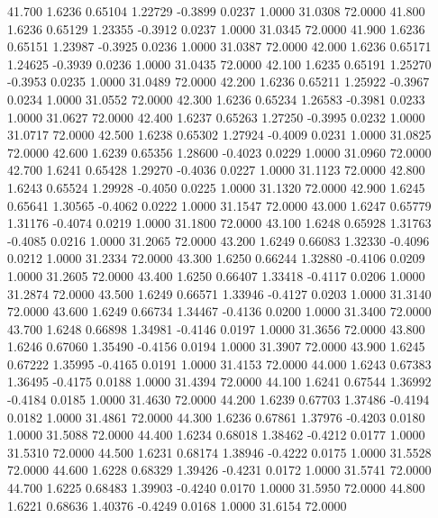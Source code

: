   41.700   1.6236   0.65104   1.22729  -0.3899   0.0237   1.0000  31.0308  72.0000
  41.800   1.6236   0.65129   1.23355  -0.3912   0.0237   1.0000  31.0345  72.0000
  41.900   1.6236   0.65151   1.23987  -0.3925   0.0236   1.0000  31.0387  72.0000
  42.000   1.6236   0.65171   1.24625  -0.3939   0.0236   1.0000  31.0435  72.0000
  42.100   1.6235   0.65191   1.25270  -0.3953   0.0235   1.0000  31.0489  72.0000
  42.200   1.6236   0.65211   1.25922  -0.3967   0.0234   1.0000  31.0552  72.0000
  42.300   1.6236   0.65234   1.26583  -0.3981   0.0233   1.0000  31.0627  72.0000
  42.400   1.6237   0.65263   1.27250  -0.3995   0.0232   1.0000  31.0717  72.0000
  42.500   1.6238   0.65302   1.27924  -0.4009   0.0231   1.0000  31.0825  72.0000
  42.600   1.6239   0.65356   1.28600  -0.4023   0.0229   1.0000  31.0960  72.0000
  42.700   1.6241   0.65428   1.29270  -0.4036   0.0227   1.0000  31.1123  72.0000
  42.800   1.6243   0.65524   1.29928  -0.4050   0.0225   1.0000  31.1320  72.0000
  42.900   1.6245   0.65641   1.30565  -0.4062   0.0222   1.0000  31.1547  72.0000
  43.000   1.6247   0.65779   1.31176  -0.4074   0.0219   1.0000  31.1800  72.0000
  43.100   1.6248   0.65928   1.31763  -0.4085   0.0216   1.0000  31.2065  72.0000
  43.200   1.6249   0.66083   1.32330  -0.4096   0.0212   1.0000  31.2334  72.0000
  43.300   1.6250   0.66244   1.32880  -0.4106   0.0209   1.0000  31.2605  72.0000
  43.400   1.6250   0.66407   1.33418  -0.4117   0.0206   1.0000  31.2874  72.0000
  43.500   1.6249   0.66571   1.33946  -0.4127   0.0203   1.0000  31.3140  72.0000
  43.600   1.6249   0.66734   1.34467  -0.4136   0.0200   1.0000  31.3400  72.0000
  43.700   1.6248   0.66898   1.34981  -0.4146   0.0197   1.0000  31.3656  72.0000
  43.800   1.6246   0.67060   1.35490  -0.4156   0.0194   1.0000  31.3907  72.0000
  43.900   1.6245   0.67222   1.35995  -0.4165   0.0191   1.0000  31.4153  72.0000
  44.000   1.6243   0.67383   1.36495  -0.4175   0.0188   1.0000  31.4394  72.0000
  44.100   1.6241   0.67544   1.36992  -0.4184   0.0185   1.0000  31.4630  72.0000
  44.200   1.6239   0.67703   1.37486  -0.4194   0.0182   1.0000  31.4861  72.0000
  44.300   1.6236   0.67861   1.37976  -0.4203   0.0180   1.0000  31.5088  72.0000
  44.400   1.6234   0.68018   1.38462  -0.4212   0.0177   1.0000  31.5310  72.0000
  44.500   1.6231   0.68174   1.38946  -0.4222   0.0175   1.0000  31.5528  72.0000
  44.600   1.6228   0.68329   1.39426  -0.4231   0.0172   1.0000  31.5741  72.0000
  44.700   1.6225   0.68483   1.39903  -0.4240   0.0170   1.0000  31.5950  72.0000
  44.800   1.6221   0.68636   1.40376  -0.4249   0.0168   1.0000  31.6154  72.0000
